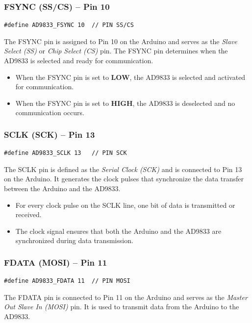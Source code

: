 \subsubsection{FSYNC (SS/CS) – Pin 10}
\begin{verbatim}
#define AD9833_FSYNC 10  // PIN SS/CS
\end{verbatim}

The FSYNC pin is assigned to Pin 10 on the Arduino and serves as the \textit{Slave Select (SS)} or \textit{Chip Select (CS)} pin. The FSYNC pin determines when the AD9833 is selected and ready for communication.

\begin{itemize}
    \item When the FSYNC pin is set to \textbf{LOW}, the AD9833 is selected and activated for communication.
    \item When the FSYNC pin is set to \textbf{HIGH}, the AD9833 is deselected and no communication occurs.
\end{itemize}

\subsubsection{SCLK (SCK) – Pin 13}
\begin{verbatim}
#define AD9833_SCLK 13   // PIN SCK
\end{verbatim}

The SCLK pin is defined as the \textit{Serial Clock (SCK)} and is connected to Pin 13 on the Arduino. It generates the clock pulses that synchronize the data transfer between the Arduino and the AD9833.

\begin{itemize}
    \item For every clock pulse on the SCLK line, one bit of data is transmitted or received.
    \item The clock signal ensures that both the Arduino and the AD9833 are synchronized during data transmission.
\end{itemize}

\subsubsection{FDATA (MOSI) – Pin 11}
\begin{verbatim}
#define AD9833_FDATA 11  // PIN MOSI
\end{verbatim}

The FDATA pin is connected to Pin 11 on the Arduino and serves as the \textit{Master Out Slave In (MOSI)} pin. It is used to transmit data from the Arduino to the AD9833.

